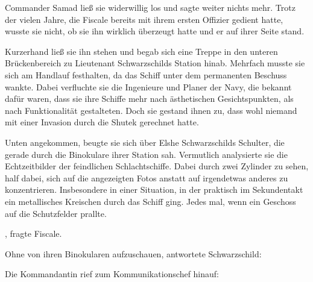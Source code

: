 \par

Commander Samad ließ sie widerwillig los und sagte weiter nichts mehr. Trotz der vielen Jahre, die Fiscale  bereits mit ihrem ersten Offizier gedient hatte, wusste sie nicht, ob sie ihn wirklich überzeugt hatte und er auf ihrer Seite stand.

\par

Kurzerhand ließ sie ihn stehen und begab sich eine Treppe in den unteren Brückenbereich zu Lieutenant Schwarzschilds Station hinab. Mehrfach musste sie sich am Handlauf festhalten, da das Schiff unter dem permanenten Beschuss wankte. Dabei verfluchte sie die Ingenieure und Planer der Navy, die bekannt dafür waren, dass sie ihre Schiffe mehr nach ästhetischen Gesichtspunkten, als nach Funktionalität gestalteten. Doch sie gestand ihnen zu, dass wohl niemand mit einer Invasion durch die Shutek gerechnet hatte.

\par

Unten angekommen, beugte sie sich über Elshe Schwarzschilds Schulter, die gerade durch die Binokulare ihrer Station sah. Vermutlich analysierte sie die Echtzeitbilder der feindlichen Schlachtschiffe. Dabei durch zwei Zylinder zu sehen, half dabei, sich auf die angezeigten Fotos anstatt auf irgendetwas anderes zu konzentrieren. Insbesondere in einer Situation, in der praktisch im Sekundentakt ein metallisches Kreischen durch das Schiff ging. Jedes mal, wenn ein Geschoss auf die Schutzfelder prallte.

\par

, fragte Fiscale.

\par

Ohne von ihren Binokularen aufzuschauen, antwortete Schwarzschild: 

\par

Die Kommandantin rief zum Kommunikationschef hinauf: 
